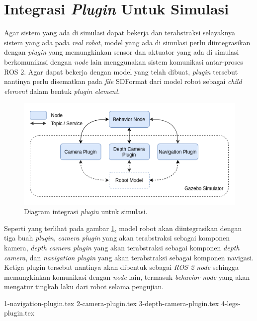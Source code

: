 \section{Integrasi \emph{Plugin} Untuk Simulasi}
\label{sec:integrasiplugin}

Agar sistem yang ada di simulasi dapat bekerja dan terabstraksi selayaknya sistem yang ada pada \emph{real robot},
  model yang ada di simulasi perlu diintegrasikan dengan \emph{plugin} yang memungkinkan sensor dan aktuator yang ada di simulasi berkomunikasi dengan \emph{node} lain menggunakan sistem komunikasi antar-proses ROS 2.
  Agar dapat bekerja dengan model yang telah dibuat, \emph{plugin} tersebut nantinya perlu disematkan pada \emph{file} SDFormat dari model robot sebagai \emph{child element} dalam bentuk \emph{plugin element}.

\begin{figure}[ht]
  \centering
  \includegraphics[scale=0.5]{gambar/integrasi-plugin-simulasi.png}
  \caption{Diagram integrasi \emph{plugin} untuk simulasi.}
  \label{fig:integrasipluginsimulasi}
\end{figure}

Seperti yang terlihat pada gambar \ref{fig:integrasipluginsimulasi},
  model robot akan diintegrasikan dengan tiga buah \emph{plugin},
  \emph{camera plugin} yang akan terabstraksi sebagai komponen kamera,
  \emph{depth camera plugin} yang akan terabstraksi sebagai komponen \emph{depth camera},
  dan \emph{navigation plugin} yang akan terabstraksi sebagai komponen navigasi.
Ketiga plugin tersebut nantinya akan dibentuk sebagai \emph{ROS 2 node} sehingga memungkinkan komunikasi dengan \emph{node} lain,
  termasuk \emph{behavior node} yang akan mengatur tingkah laku dari robot selama pengujian.

{1-navigation-plugin.tex}
{2-camera-plugin.tex}
{3-depth-camera-plugin.tex}
{4-legs-plugin.tex}
